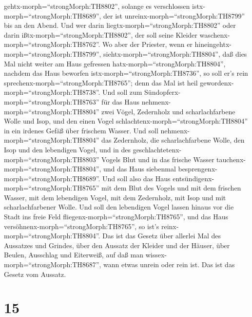 gehtx-morph=``strongMorph:TH8802'', solange es verschlossen
istx-morph=``strongMorph:TH8689'', der ist
unreinx-morph=``strongMorph:TH8799'' bis an den Abend.  Und
wer darin liegtx-morph=``strongMorph:TH8802'' oder darin
ißtx-morph=``strongMorph:TH8802'', der soll seine Kleider
waschenx-morph=``strongMorph:TH8762''.  Wo aber der
Priester, wenn er hineingehtx-morph=``strongMorph:TH8799'',
siehtx-morph=``strongMorph:TH8804'', daß dies Mal nicht weiter am Haus
gefressen hatx-morph=``strongMorph:TH8804'', nachdem das Haus beworfen
istx-morph=``strongMorph:TH8736'', so soll er's rein
sprechenx-morph=``strongMorph:TH8765''; denn das Mal ist heil
gewordenx-morph=``strongMorph:TH8738''.  Und soll zum
Sündopferx-morph=``strongMorph:TH8763'' für das Haus
nehmenx-morph=``strongMorph:TH8804'' zwei Vögel, Zedernholz und
scharlachfarbene Wolle und Isop,  und den einen Vogel
schlachtenx-morph=``strongMorph:TH8804'' in ein irdenes Gefäß über
frischem Wasser.  Und soll
nehmenx-morph=``strongMorph:TH8804'' das Zedernholz, die
scharlachfarbene Wolle, den Isop und den lebendigen Vogel, und in des
geschlachtetenx-morph=``strongMorph:TH8803'' Vogels Blut und in das
frische Wasser tauchenx-morph=``strongMorph:TH8804'', und das Haus
siebenmal besprengenx-morph=``strongMorph:TH8689''.  Und
soll also das Haus entsündigenx-morph=``strongMorph:TH8765'' mit dem
Blut des Vogels und mit dem frischen Wasser, mit dem lebendigen Vogel,
mit dem Zedernholz, mit Isop und mit scharlachfarbener Wolle.
 Und soll den lebendigen Vogel lassen hinaus vor die Stadt
ins freie Feld fliegenx-morph=``strongMorph:TH8765'', und das Haus
versöhnenx-morph=``strongMorph:TH8765'', so ist's
reinx-morph=``strongMorph:TH8804''.  Das ist das Gesetz
über allerlei Mal des Aussatzes und Grindes,  über den
Aussatz der Kleider und der Häuser,  über Beulen, Ausschlag
und Eiterweiß,  auf daß man
wissex-morph=``strongMorph:TH8687'', wann etwas unrein oder rein ist.
Das ist das Gesetz vom Aussatz.

\hypertarget{section-14}{%
\section{15}\label{section-14}}

